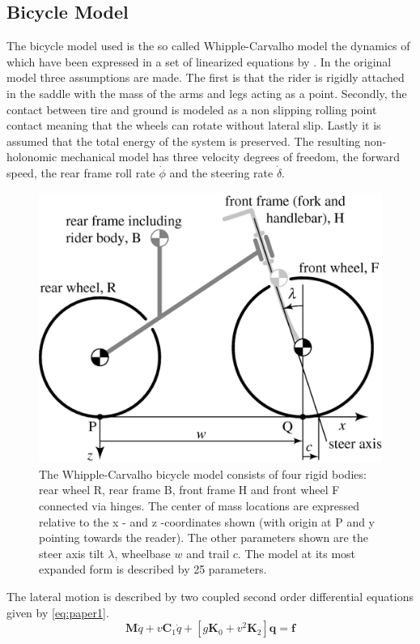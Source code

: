 \subsection{Bicycle Model}
The bicycle model used is the so called Whipple-Carvalho model the dynamics of which have been expressed in a set of linearized equations by \citet{meijaard2007linearized}. In the original model three assumptions are made. The first is that the rider is rigidly attached in the saddle with the mass of the arms and legs acting as a point. Secondly, the contact between tire and ground is modeled as a non slipping rolling point contact meaning that the wheels can rotate without lateral slip. Lastly it is assumed that the total energy of the system is preserved. The resulting non-holonomic mechanical model has three velocity degrees of freedom, the forward speed, the rear frame roll rate \ensuremath{\dot{\phi}} and the steering rate \ensuremath{\dot{\delta}}.
\begin{figure}[ht]
    \centering
    \includegraphics[scale=0.3]{images/figure3_1.png}
    \caption{ The Whipple-Carvalho bicycle model consists of four rigid bodies: rear wheel R, rear frame B, front frame H and front wheel F connected via hinges. The center of mass locations are expressed relative to the x - and z -coordinates shown (with origin at P and y pointing towards the reader). The other parameters shown are the steer axis tilt \ensuremath{\lambda}, wheelbase \ensuremath{w} and trail \ensuremath{c}. The model at its most expanded form is described by 25 parameters.\cite{meijaard2007linearized}}
    \label{fig:figure2}
\end{figure}
The lateral motion is described by  two coupled second order differential equations given by \cref{eq:paper1}.
\begin{equation}
    \mathbf{M} \ddot{q}+v \mathbf{C}_{1} \dot{q}+\left[g \mathbf{K}_{0}+v^{2} \mathbf{K}_{2}\right] \mathbf{q}=\mathbf{f}
    \label{eq:paper1}
\end{equation}


